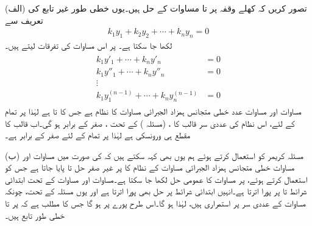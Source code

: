 
(الف) \quad تصور کریں کہ کھلے وقفہ  پر   تا  مساوات  کے حل ہیں۔یوں خطی طور غیر تابع کی تعریف سے 
\begin{align}\label{مساوات_سادہ_بلند_ورونسکی_ب}
k_1y_1+k_2y_2+\cdots+k_ny_n=0
\end{align}
لکھا جا سکتا ہے۔  پر اس مساوات کی  تفرقات لیتے ہیں۔
\begin{gather}
\begin{aligned}\label{مساوات_سادہ_بلند_ورونسکی_پ}
k_1y'_1+\cdots+k_ny'_n&=0\\
k_1y''_1+\cdots+k_ny''_n&=0\\
\vdots &\\
k_1y^{(n-1)}_1+\cdots+k_ny^{(n-1)}_n&=0
\end{aligned}
\end{gather}
مساوات  اور مساوات   عدد خطی متجانس ہمزاد  الجبرائی مساوات کا نظام ہے جس کا   تا  ہے لہٰذا  پر تمام  کے لئے، اس نظام کی عددی سر قالب کا ،  (مسئلہ ) کے تحت ،  صفر کے برابر ہو گی۔اب قالب کا مقطع ہی ورونسکی ہے لہٰذا  پر تمام  کے لئے  صفر کے برابر ہے۔

(ب) \quad مسئلہ کریمر کو استعمال کرتے ہوئے ہم یوں بھی کہہ سکتے ہیں کہ  کی صورت میں مساوات  اور مساوات  خطی متجانس ہمزاد  الجبرائی مساوات کے نظام کا  پر غیر صفر حل  تا  پایا جاتا ہے جس کو استعمال کرتے ہوئے،  پر مساوات  کا عمومی حل لکھا جا سکتا ہے۔مساوات  اور مساوات   کے تحت   ابتدائی شرائط  تا  پر پورا اترتا ہے۔انہیں ابتدائی شرائط پر حل  بھی پورا اترتا ہے اور یوں مسئلہ  کے تحت، چونکہ  مساوات  کے عددی سر  پر استمراری ہیں، لہٰذا  ہو گا۔اس طرح  پورے  پر ہو گا جس کا مطلب ہے کہ   پر  تا  خطی طور تابع ہیں۔

